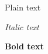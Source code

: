 \documentclass[a4paper]{article}
\begin{document}
        Plain text

        \textit{Italic text}

        \textbf{Bold text}
\end{document}
